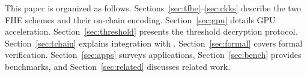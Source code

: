 This paper is organized as follows. Sections~\ref{sec:tfhe}--\ref{sec:ckks} describe the two FHE schemes and their on-chain encoding. Section~\ref{sec:gpu} details GPU acceleration. Section~\ref{sec:threshold} presents the threshold decryption protocol. Section~\ref{sec:tchain} explains integration with \TChain{}. Section~\ref{sec:formal} covers formal verification. Section~\ref{sec:apps} surveys applications, Section~\ref{sec:bench} provides benchmarks, and Section~\ref{sec:related} discusses related work.

